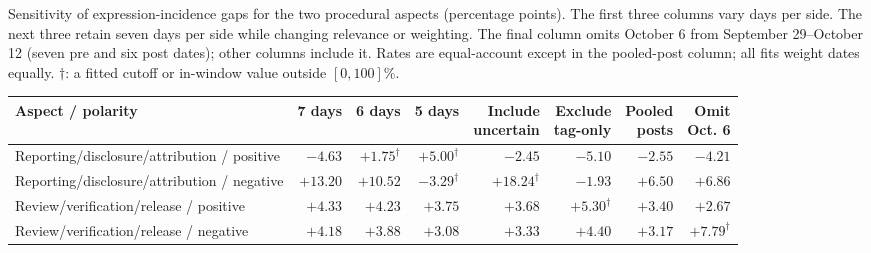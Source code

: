\caption{Sensitivity of expression-incidence gaps for the two procedural aspects (percentage points). The first three columns vary days per side. The next three retain seven days per side while changing relevance or weighting. The final column omits October 6 from September 29--October 12 (seven pre and six post dates); other columns include it. Rates are equal-account except in the pooled-post column; all fits weight dates equally. $\dagger$: a fitted cutoff or in-window value outside $[0,100]\%$.}
\label{tab:rq4aspectsensitivity}
\centering
\begin{tabular*}{\textwidth}{@{\extracolsep{\fill}}lrrrrrrr@{}}
\toprule Aspect / polarity & 7 days & 6 days & 5 days & \shortstack{Include\\uncertain} & \shortstack{Exclude\\tag-only} & \shortstack{Pooled\\posts} & \shortstack{Omit\\Oct. 6}\\
\midrule
Reporting/disclosure/attribution / positive & $-4.63$ & $+1.75^{\dagger}$ & $+5.00^{\dagger}$ & $-2.45$ & $-5.10$ & $-2.55$ & $-4.21$\\
Reporting/disclosure/attribution / negative & $+13.20$ & $+10.52$ & $-3.29^{\dagger}$ & $+18.24^{\dagger}$ & $-1.93$ & $+6.50$ & $+6.86$\\
Review/verification/release / positive & $+4.33$ & $+4.23$ & $+3.75$ & $+3.68$ & $+5.30^{\dagger}$ & $+3.40$ & $+2.67$\\
Review/verification/release / negative & $+4.18$ & $+3.88$ & $+3.08$ & $+3.33$ & $+4.40$ & $+3.17$ & $+7.79^{\dagger}$\\
\bottomrule
\end{tabular*}
